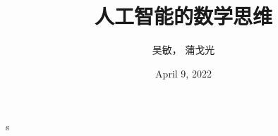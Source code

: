 \documentclass[lang=cn,12pt]{book}
\title{人工智能的数学思维}
\author{吴敏，  蒲戈光}
\date{April 9, 2022}
\begin{document}
\maketitle
\frontmatter

\tableofcontents

\mainmatter

%
%
s
%
%
%	
%
%
%

\end{document}
